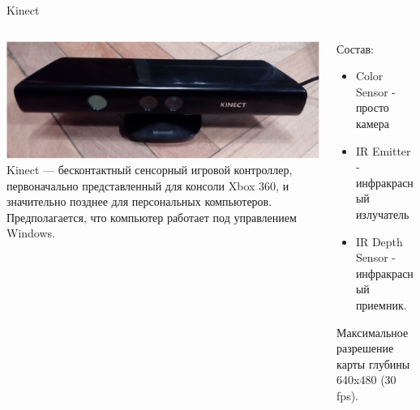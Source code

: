 \documentclass{beamer}
\begin{document}
\begin{frame}{Kinect}
    \begin{columns}[T]
        \begin{column}[T]{5cm}
            \includegraphics[scale=0.045]{kinect1}\\
            Kinect — бесконтактный сенсорный игровой контроллер, первоначально представленный для консоли Xbox 360, и значительно позднее для персональных компьютеров.
            Предполагается, что компьютер работает под управлением Windows.
        \end{column}

        \begin{column}[T]{5cm}
            Состав:
            \begin{itemize}
            \item Color Sensor - просто камера
            \item IR Emitter - инфракрасный излучатель
            \item IR Depth Sensor - инфракрасный приемник. 
            \end{itemize}
            Максимальное разрешение карты глубины 640x480 (30 fps). 
        \end{column}
    \end{columns}
    \begin{center}
    \small

    \end{center}

\end{frame}
\end{document}
